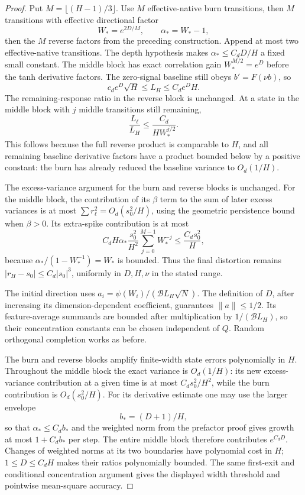 \begin{proof}
Put $M=\lfloor(H-1)/3\rfloor$. Use $M$ effective-native burn transitions, then $M$ transitions with effective directional factor
\[
 W_*=e^{2D/M},\qquad \alpha_*=W_*-1,
\]
then the $M$ reverse factors from the preceding construction. Append at most two effective-native transitions. The depth hypothesis makes $\alpha_*\le C_dD/H$ a fixed small constant. The middle block has exact correlation gain $W_*^{M/2}=e^D$ before the tanh derivative factors. The zero-signal baseline still obeys $b'=F(\nu b)$, so
\[
 c_de^D\sqrt H\le L_H\le C_de^DH.
\]
The remaining-response ratio in the reverse block is unchanged. At a state in the middle block with $j$ middle transitions still remaining,
\[
 \frac{L_\ell}{L_H}\le\frac{C_d}{H W_*^{j/2}}.
\]
This follows because the full reverse product is comparable to $H$, and all remaining baseline derivative factors have a product bounded below by a positive constant: the burn has already reduced the baseline variance to $O_d(1/H)$.

The excess-variance argument for the burn and reverse blocks is unchanged. For the middle block, the contribution of its $\beta$ term to the sum of later excess variances is at most $\sum r_\ell^2=O_d(s_0^2/H)$, using the geometric persistence bound when $\beta>0$. Its extra-spike contribution is at most
\[
 C_dH\alpha_*\frac{s_0^2}{H^2}
                 \sum_{j=0}^{M-1}W_*^{-j}
 \le\frac{C_ds_0^2}{H},
\]
because $\alpha_*/(1-W_*^{-1})=W_*$ is bounded. Thus the final distortion remains $|r_H-s_0|\le C_d|s_0|^3$, uniformly in $D,H,\nu$ in the stated range.

The initial direction uses $a_i=\psi(W_i)/(\mathcal B L_H\sqrt N)$. The definition of $D$, after increasing its dimension-dependent coefficient, guarantees $\|a\|\le1/2$. Its feature-average summands are bounded after multiplication by $1/(\mathcal B L_H)$, so their concentration constants can be chosen independent of $Q$. Random orthogonal completion works as before.

The burn and reverse blocks amplify finite-width state errors polynomially in $H$. Throughout the middle block the exact variance is $O_d(1/H)$: its new excess-variance contribution at a given time is at most $C_ds_0^2/H^2$, while the burn contribution is $O_d(s_0^2/H)$. For its derivative estimate one may use the larger envelope
\[
 b_*=(D+1)/H,
\]
so that $\alpha_*\le C_db_*$ and the weighted norm from the prefactor proof gives growth at most $1+C_db_*$ per step. The entire middle block therefore contributes $e^{C_dD}$. Changes of weighted norms at its two boundaries have polynomial cost in $H$; $1\le D\le C_dH$ makes their ratios polynomially bounded. The same first-exit and conditional concentration argument gives the displayed width threshold and pointwise mean-square accuracy.


\end{proof}
